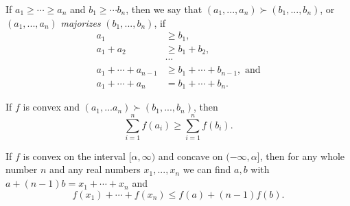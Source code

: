 \begin{defn} If $a_1 \ge \cdots \ge a_n$ and $b_1 \ge \cdots b_n$, then we say that $(a_1, ..., a_n) \succ (b_1, ..., b_n)$, or $(a_1, ..., a_n)$ \emph{majorizes} $(b_1, ..., b_n)$, if
\begin{align*}
a_1 &\ge b_1,\\
a_1 + a_2 &\ge b_1+b_2,\\
&\cdots\\
a_1 + \cdots + a_{n-1} &\ge b_1 + \cdots + b_{n-1}, \mbox{ and}\\
a_1 + \cdots + a_n &= b_1 + \cdots + b_n.
\end{align*}
\end{defn}

\begin{thm}[Karamata] If $f$ is convex and $(a_1, ... a_n) \succ (b_1, ..., b_n)$, then
\[
\sum_{i=1}^n f(a_i) \ge \sum_{i=1}^n f(b_i).
\]
\end{thm}

\begin{thm}\label{n-1} If $f$ is convex on the interval $[\alpha,\infty)$ and concave on $(-\infty,\alpha]$, then for any whole number $n$ and any real numbers $x_1, ..., x_n$ we can find $a,b$ with $a+(n-1)b = x_1 + \cdots + x_n$ and
\[
f(x_1) + \cdots + f(x_n) \le f(a) + (n-1)f(b).
\]
\end{thm}

